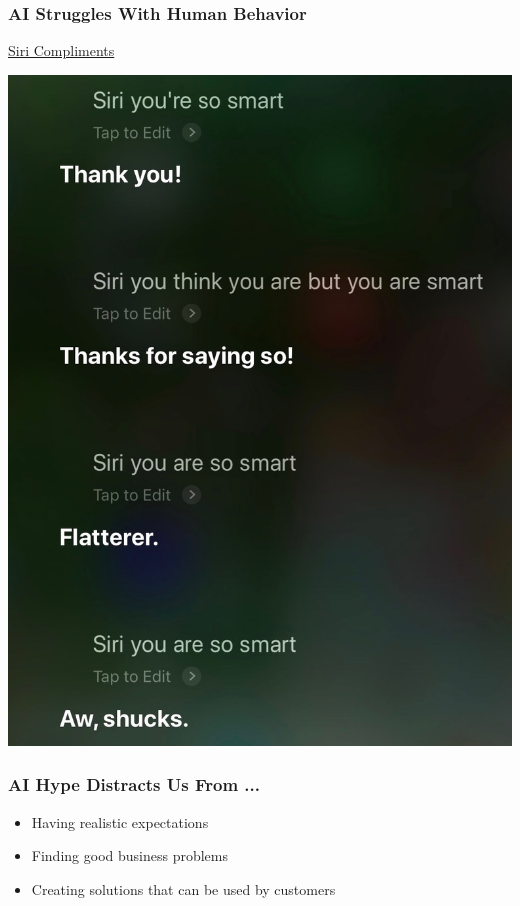 \begin{frame}
\frametitle{AI Struggles With Human Behavior}
\href{run:figures/siri_smart_sarcasm.m4a}{Siri Compliments}

\begin{center}
\includegraphics[height=0.7\textheight]{figures/siri_transcript.jpeg}
\end{center}
\end{frame}

\begin{frame}
\frametitle{AI Hype Distracts Us From ...}
\begin{itemize}
\item Having realistic expectations
\item Finding good business problems
\item Creating solutions that can be used by customers
\end{itemize}
\end{frame}

